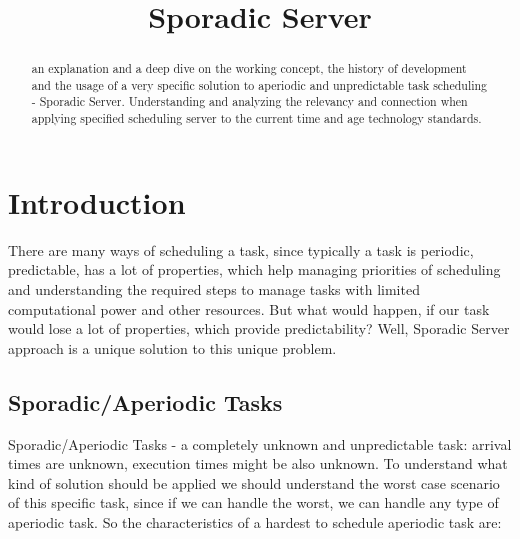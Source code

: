 \documentclass[conference]{IEEEtran}
\begin{document}
\title{Sporadic Server}

\author{
}

\maketitle

\begin{abstract}
an explanation and a deep dive on the working concept, the history of development and the usage of a very specific solution to aperiodic and unpredictable task scheduling - Sporadic Server. Understanding and analyzing the relevancy and connection when applying specified scheduling server to the current time and age technology standards.
\end{abstract}



\thispagestyle{firstpagefooter}

\section{Introduction}
There are many ways of scheduling a task, since typically a task is periodic, predictable, has a lot of properties, which help managing priorities of scheduling and understanding the required steps to manage tasks with limited computational power and other resources. But what would happen, if our task would lose a lot of properties, which provide predictability? Well, Sporadic Server approach is a unique solution to this unique problem.

\subsection{Sporadic/Aperiodic Tasks}

Sporadic/Aperiodic Tasks - a completely unknown and unpredictable task: arrival times are unknown, execution times might be also unknown. To understand what kind of solution should be applied we should understand the worst case scenario of this specific task, since if we can handle the worst, we can handle any type of aperiodic task. So the characteristics of a hardest to schedule aperiodic task are:
\end{document}
